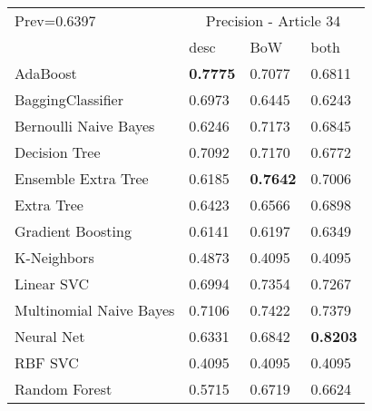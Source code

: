 \begin{tabular}{|l|l|l|l| }
\hline
Prev=0.6397 &  \multicolumn{3}{c|}{Precision - Article 34} \\
\cline{2-4} & desc & BoW & both \\ \hline
AdaBoost                & {\bf 0.7775} & 0.7077 & 0.6811\\
BaggingClassifier       & 0.6973 & 0.6445 & 0.6243\\
Bernoulli Naive Bayes   & 0.6246 & 0.7173 & 0.6845\\
Decision Tree           & 0.7092 & 0.7170 & 0.6772\\
Ensemble Extra Tree     & 0.6185 & {\bf 0.7642} & 0.7006\\
Extra Tree              & 0.6423 & 0.6566 & 0.6898\\
Gradient Boosting       & 0.6141 & 0.6197 & 0.6349\\
K-Neighbors             & 0.4873 & 0.4095 & 0.4095\\
Linear SVC              & 0.6994 & 0.7354 & 0.7267\\
Multinomial Naive Bayes & 0.7106 & 0.7422 & 0.7379\\
Neural Net              & 0.6331 & 0.6842 & {\bf 0.8203}\\
RBF SVC                 & 0.4095 & 0.4095 & 0.4095\\
Random Forest           & 0.5715 & 0.6719 & 0.6624\\
\hline
\end{tabular}